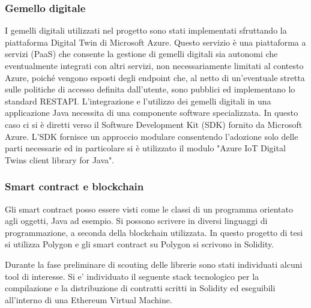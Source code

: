 \documentclass[a4paper,11pt]{article}
\begin{document}
\subsubsection{Gemello digitale}

I gemelli digitali utilizzati nel progetto sono stati implementati sfruttando la piattaforma Digital Twin di Microsoft Azure. Questo servizio è una piattaforma a servizi (PaaS) che consente la gestione di gemelli digitali sia autonomi che eventualmente integrati con altri servizi, non necessariamente limitati al contesto Azure, poiché vengono esposti degli endpoint che, al netto di un'eventuale stretta sulle politiche di accesso definita dall'utente, sono pubblici ed implementano lo standard RESTAPI.
L'integrazione e l'utilizzo dei gemelli digitali in una applicazione Java necessita di una componente software specializzata. In questo caso ci si è diretti verso il Software Development Kit (SDK) fornito da Microsoft Azure.
L'SDK fornisce un approccio modulare consentendo l'adozione solo delle parti necessarie ed in particolare si è utilizzato il modulo "Azure IoT Digital Twins client library for Java".

\subsubsection{Smart contract e blockchain}

Gli smart contract posso essere visti come le classi di un programma orientato agli oggetti, Java ad esempio. Si possono scrivere in diversi linguaggi di programmazione, a seconda della blockchain utilizzata. In questo progetto di tesi si utilizza Polygon e gli smart contract su Polygon si scrivono in Solidity.


Durante la fase preliminare di scouting delle librerie sono stati individuati alcuni tool di interesse. Si e' individuato il seguente stack tecnologico per la compilazione e la distribuzione di contratti scritti in Solidity ed eseguibili all'interno di una Ethereum Virtual Machine.
\end{document}
